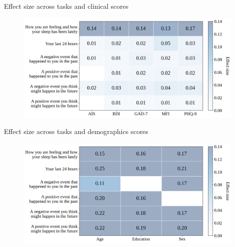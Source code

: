\documentclass[handout,10pt]{beamer}
\begin{document}
\begin{frame}{Effect size across tasks and clinical scores}

\begin{figure}
    \centering
    \includegraphics[scale=0.35]{img/topic_modeling/heatmap_effect_sizes/V5_V6_V7_V8_V9_V10_phq9_gad7_bdi_ais_mfi_global_heatmap.png}
    \label{fig:popgen_clinical_heatmap}
\end{figure}

\end{frame}

\begin{frame}{Effect size across tasks and demographics scores}

\begin{figure}
    \centering
    \includegraphics[scale=0.35]{img/topic_modeling/heatmap_effect_sizes/V5_V6_V7_V8_V9_V10_diploma_level_gender_age_global_heatmap.png}
    \label{fig:popgen_demo_heatmap}
\end{figure}

\end{frame}
\end{document}
